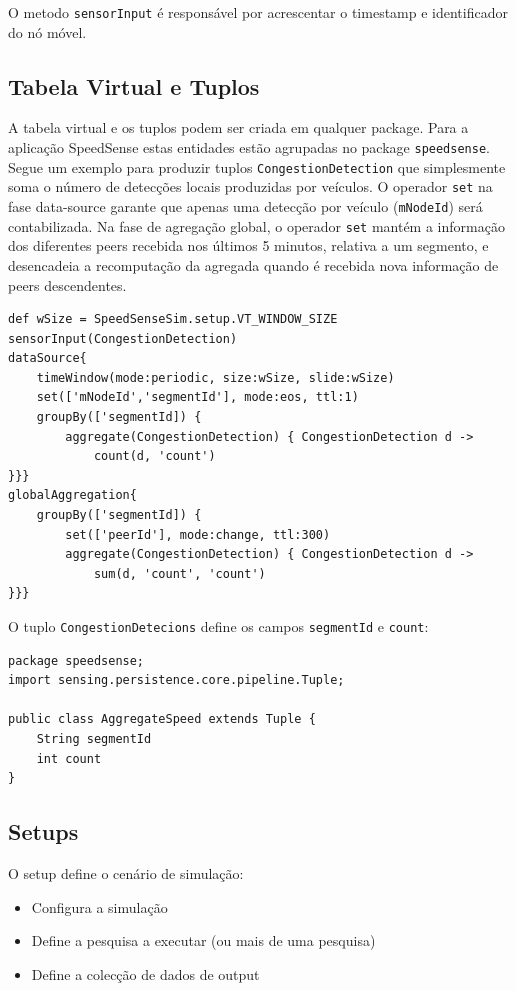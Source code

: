 \documentclass{article}
\newcommand{\tm}[1]{\texttt{#1}}
\begin{document}
O metodo \tm{sensorInput} é responsável por acrescentar o timestamp e identificador do nó móvel.

\subsection{Tabela Virtual e Tuplos}
A tabela virtual e os tuplos podem ser criada em qualquer package. Para a aplicação SpeedSense estas entidades estão agrupadas no package \tm{speedsense}. Segue um exemplo para produzir tuplos \tm{CongestionDetection} que simplesmente soma o número de detecções locais produzidas por veículos.
O operador \tm{set} na fase data-source garante que apenas uma detecção por veículo (\tm{mNodeId}) será contabilizada. Na fase de agregação global, o operador \tm{set} mantém a informação dos diferentes peers recebida nos últimos 5 minutos, relativa a um segmento, e desencadeia a recomputação da agregada quando é recebida nova informação de peers descendentes.

\begin{Verbatim}
def wSize = SpeedSenseSim.setup.VT_WINDOW_SIZE
sensorInput(CongestionDetection)
dataSource{
	timeWindow(mode:periodic, size:wSize, slide:wSize)
	set(['mNodeId','segmentId'], mode:eos, ttl:1)
	groupBy(['segmentId]) {
		aggregate(CongestionDetection) { CongestionDetection d ->
			count(d, 'count')
}}}
globalAggregation{
	groupBy(['segmentId]) {
		set(['peerId'], mode:change, ttl:300)
		aggregate(CongestionDetection) { CongestionDetection d ->
			sum(d, 'count', 'count')
}}}
\end{Verbatim}

O tuplo \tm{CongestionDetecions} define os campos \tm{segmentId} e \tm{count}:
\begin{Verbatim}
package speedsense;
import sensing.persistence.core.pipeline.Tuple;

public class AggregateSpeed extends Tuple {
	String segmentId
	int count
}
\end{Verbatim}

\subsection{Setups}
O setup define o cenário de simulação:
\begin{itemize}
\item Configura a simulação
\item Define a pesquisa a executar (ou mais de uma pesquisa)
\item Define a colecção de dados de output
\end{itemize} 
\end{document}
